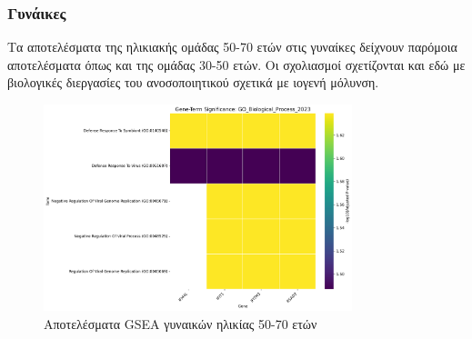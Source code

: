 \documentclass[12pt]{report}
\begin{document}
            \subsubsection{Γυνάικες}
            \par
                Τα αποτελέσματα της ηλικιακής ομάδας 50-70 ετών στις γυναίκες δείχνουν παρόμοια αποτελέσματα όπως και της ομάδας 30-50 ετών. Οι σχολιασμοί σχετίζονται και εδώ με βιολογικές διεργασίες του ανοσοποιητικού σχετικά με ιογενή μόλυνση.
            \begin{figure}[H]
                \centering
                \includegraphics[width=0.8\textwidth]{GSEA/Females/50-70/gsea_results_Female_50-70_GO_Biological_Process_2023_heatmap.png}
                \caption{Αποτελέσματα GSEA γυναικών ηλικίας 50-70 ετών}
                \label{fig:gsea_results_Female_50-70_GO_Biological_Process_2023_heatmap}
            \end{figure}
        


    
    
    
\end{document}
